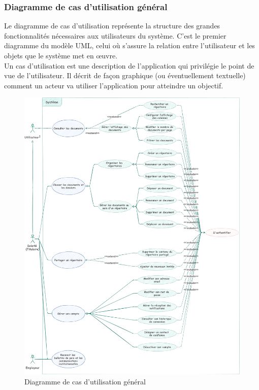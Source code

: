 \subsubsection{Diagramme de cas d'utilisation général}
Le diagramme de cas d'utilisation représente la structure des grandes fonctionnalités nécessaires aux utilisateurs du système. C'est le premier diagramme du modèle UML, celui où s'assure la relation entre l'utilisateur et les objets que le système met en œuvre.\\
Un cas d'utilisation est une description de l'application qui privilégie le point de vue de l'utilisateur. Il décrit de façon graphique (ou éventuellement textuelle) comment un acteur va utiliser l'application pour atteindre un objectif.
\begin{figure}[H]
    \includegraphics[width=1.1\linewidth]{images/sec3/usecase.pdf}
    \caption{Diagramme de cas d'utilisation général}
    \label{fig:uc}
\end{figure}
\hfill
\vspace{-1.5cm}
